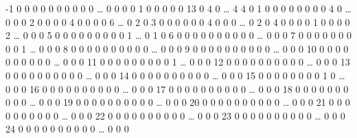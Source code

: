 \documentclass[letterpaper,10pt,english]{sphinxmanual}
\begin{document}
{\begin{sphinxVerbatim}[commandchars=\\\{\}]
-1     0    0    0    0    0    0    0    0    0    0  {\ldots}    0    0    0
 0     1    0    0    0    0    0   13    0    4    0  {\ldots}    4    4    0
 1     0    0    0    0    0    0    0    0    4    0  {\ldots}    0    0    0
 2     0    0    0    0    4    0    0    0    0    6  {\ldots}    0    2    0
 3     0    0    0    0    0    0    4    0    0    0  {\ldots}    0    2    0
 4     0    0    0    0    1    0    0    0    0    2  {\ldots}    0    0    0
 5     0    0    0    0    0    0    0    0    0    1  {\ldots}    0    1    0
 6     0    0    0    0    0    0    0    0    0    0  {\ldots}    0    0    0
 7     0    0    0    0    0    0    0    0    0    1  {\ldots}    0    0    0
 8     0    0    0    0    0    0    0    0    0    0  {\ldots}    0    0    0
 9     0    0    0    0    0    0    0    0    0    0  {\ldots}    0    0    0
 10    0    0    0    0    0    0    0    0    0    0  {\ldots}    0    0    0
 11    0    0    0    0    0    0    0    0    0    1  {\ldots}    0    0    0
 12    0    0    0    0    0    0    0    0    0    0  {\ldots}    0    0    0
 13    0    0    0    0    0    0    0    0    0    0  {\ldots}    0    0    0
 14    0    0    0    0    0    0    0    0    0    0  {\ldots}    0    0    0
 15    0    0    0    0    0    0    0    0    1    0  {\ldots}    0    0    0
 16    0    0    0    0    0    0    0    0    0    0  {\ldots}    0    0    0
 17    0    0    0    0    0    0    0    0    0    0  {\ldots}    0    0    0
 18    0    0    0    0    0    0    0    0    0    0  {\ldots}    0    0    0
 19    0    0    0    0    0    0    0    0    0    0  {\ldots}    0    0    0
 20    0    0    0    0    0    0    0    0    0    0  {\ldots}    0    0    0
 21    0    0    0    0    0    0    0    0    0    0  {\ldots}    0    0    0
 22    0    0    0    0    0    0    0    0    0    0  {\ldots}    0    0    0
 23    0    0    0    0    0    0    0    0    0    0  {\ldots}    0    0    0
 24    0    0    0    0    0    0    0    0    0    0  {\ldots}    0    0    0


\end{sphinxVerbatim}}
\end{document}
